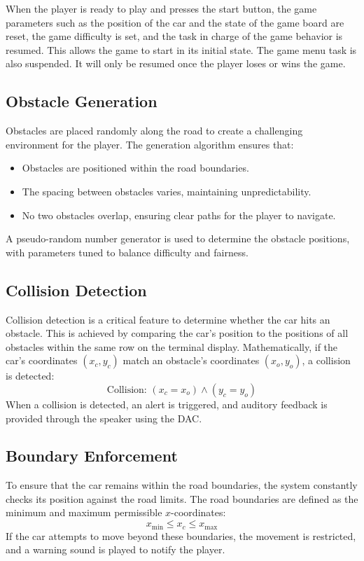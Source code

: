 \documentclass[conference]{IEEEtran}
\begin{document}
When the player is ready to play and presses the start button, the game parameters such as the position of the car and the state of the game board are reset, the game difficulty is set, and the task in charge of the game behavior is resumed. This allows the game to start in its initial state. The game menu task is also suspended. It will only be resumed once the player loses or wins the game.

\subsection{Obstacle Generation}
Obstacles are placed randomly along the road to create a challenging environment for the player. The generation algorithm ensures that:
\begin{itemize}
    \item Obstacles are positioned within the road boundaries.
    \item The spacing between obstacles varies, maintaining unpredictability.
    \item No two obstacles overlap, ensuring clear paths for the player to navigate.
\end{itemize}
A pseudo-random number generator is used to determine the obstacle positions, with parameters tuned to balance difficulty and fairness.

\subsection{Collision Detection}
Collision detection is a critical feature to determine whether the car hits an obstacle. This is achieved by comparing the car's position to the positions of all obstacles within the same row on the terminal display. Mathematically, if the car's coordinates $(x_c, y_c)$ match an obstacle's coordinates $(x_o, y_o)$, a collision is detected:
\begin{equation}
\text{Collision: } (x_c = x_o) \land (y_c = y_o)
\end{equation}
When a collision is detected, an alert is triggered, and auditory feedback is provided through the speaker using the DAC.

\subsection{Boundary Enforcement}
To ensure that the car remains within the road boundaries, the system constantly checks its position against the road limits. The road boundaries are defined as the minimum and maximum permissible $x$-coordinates:
\begin{equation}
x_{\text{min}} \leq x_c \leq x_{\text{max}}
\end{equation}
If the car attempts to move beyond these boundaries, the movement is restricted, and a warning sound is played to notify the player.
\end{document}
